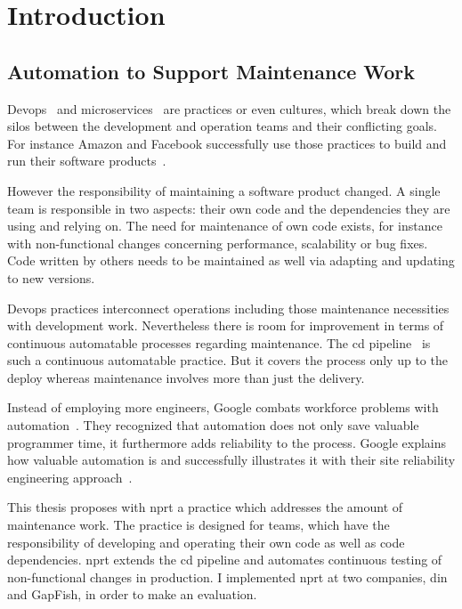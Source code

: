 \chapter{Introduction}
\label{chap:intro}
\section{Automation to Support Maintenance Work}

Devops~\cite{devops_definition} and microservices~\cite{microservices_fowler} are
practices or even cultures, which break down the silos between the development and
operation teams and their conflicting goals. For instance Amazon and Facebook successfully
use those practices to build and run their software products~\cite{build_run,dev_at_fb}.

However the responsibility of maintaining a software product changed. A single team is
responsible in two aspects: their own code and the dependencies they are using and relying
on. The need for maintenance of own code exists, for instance with non-functional changes
concerning performance, scalability or bug fixes. Code written by others needs to be
maintained as well via adapting and updating to new versions.

Devops practices interconnect operations including those maintenance necessities with
development work. Nevertheless there is room for improvement in terms of continuous
automatable processes regarding maintenance. The \gls{cd}
pipeline~\cite{cd_humble_pipeline} is such a continuous automatable practice. But it
covers the process only up to the deploy whereas maintenance involves more than just the
delivery.

Instead of employing more engineers, Google combats workforce problems with
automation~\cite{sre_automation}. They recognized that automation does not only save
valuable programmer time, it furthermore adds reliability to the process. Google explains
how valuable automation is and successfully illustrates it with their site reliability
engineering approach~\cite{sre_intro}.

This thesis proposes with \gls{nprt} a practice which addresses the amount of maintenance
work. The practice is designed for teams, which have the responsibility of developing and
operating their own code as well as code dependencies. \gls{nprt} extends the \gls{cd}
pipeline and automates continuous testing of non-functional changes in production. I
implemented \gls{nprt} at two companies, \gls{din} and GapFish, in order to make an
evaluation.

